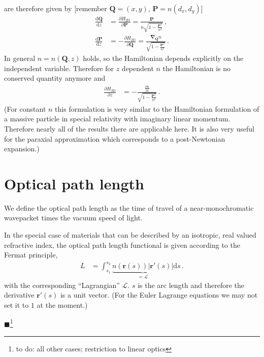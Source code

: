 \documentclass[12pt,a4paper,twoside,openright,BCOR10mm,headsepline,titlepage,abstracton,chapterprefix,final]{scrreprt}
\newcommand\Vector[1]{{\mathbf{#1}}}
\newcommand{\remark}[1]{{\color{red}$\blacksquare$}\footnote{{\color{red}#1}}}
\begin{document}
are therefore given by [remember $\Vector{Q} = (x,y)$, $\Vector{P} = n (d_x, d_y)$]
\begin{subequations}
\label{eq:H2Deom}
\begin{align}
 \frac{\text{d}\Vector{Q}}{\text{d}z} &= \frac{\partial H_{\text{2D}}}{\partial \Vector{P}} = \frac{\Vector{P}}{n \sqrt{1 - \frac{\Vector{P}^2}{n^2}}}\,,\\
 \frac{\text{d}\Vector{P}}{\text{d}z} &= -\frac{\partial H_{\text{2D}}}{\partial \Vector{Q}} = \frac{\Vector{\nabla}_{\Vector{Q}} n}{\sqrt{1 - \frac{\Vector{P}^2}{n^2}}}\,.    
\end{align}
\end{subequations}
In general $n = n(\Vector{Q}, z)$ holds, so the Hamiltonian depends explicitly on the independent variable.
Therefore for $z$ dependent $n$ the Hamiltonian is no conserved quantity anymore and
\begin{align}
 \frac{\partial H_{\text{2D}}}{\partial z} &= -\frac{\frac{\partial n}{\partial z}}{\sqrt{1 - \frac{\Vector{P}^2}{n^2}}}\,.
\end{align}
(For constant $n$ this formulation is very similar to the Hamiltonian formulation of a 
massive particle in special relativity with imaginary linear momentum.
Therefore nearly all of the results there are applicable here. It is also very useful 
for the paraxial approximation which corresponds to a post-Newtonian expansion.)

\section{Optical path length}
We define the optical path length as the time of travel of a near-monochromatic wavepacket times the vacuum speed of light.

In the special case of materials that can be described by an isotropic, real valued refractive index, the optical path length functional is given according to the Fermat principle,
\begin{align}
 L &= \int_{s_1}^{s_2} \underbrace{n(\Vector{r}(s)) |\Vector{r}'(s)|}_{=\mathcal{L}} \text{d}s\,.\label{eq:fermatiso}
\end{align}
with the corresponding ``Lagrangian'' $\mathcal{L}$.
$s$ is the arc length and therefore the derivative $\Vector{r}'(s)$ is a unit vector. (For the Euler Lagrange
equations we may not set it to $1$ at the moment.)

\remark{to do: all other cases; restriction to linear optics}
\end{document}
